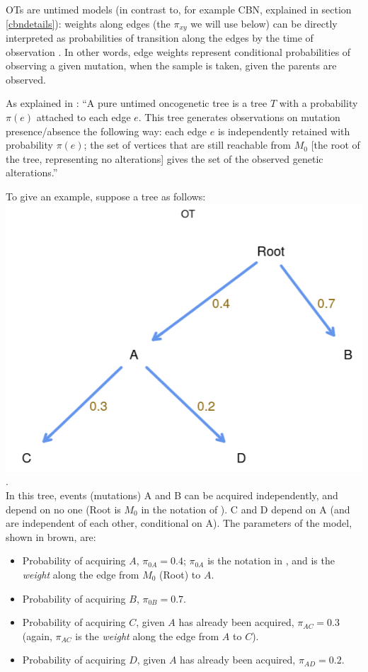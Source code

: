 \documentclass[a4paper,11pt]{article}
\begin{document}
OTs are untimed models (in contrast to, for example CBN, explained in section \ref{cbndetails}): weights along edges (the $\pi_{xy}$ we will use below) can be directly interpreted as probabilities of transition along the edges by the time of observation \citep[p.~5]{Szabo2008}. In other words, edge weights represent conditional probabilities of observing a given mutation, when the sample is taken, given the parents are observed.

As explained in \citep[Definition 1, p.~4]{Szabo2008}:  ``A pure untimed oncogenetic tree is a tree $T$ with a probability $\pi(e)$ attached to each edge $e$. This tree generates observations on mutation presence/absence the following way: each edge $e$ is independently retained with probability $\pi(e)$; the set of vertices that are still reachable from $M_0$ [the root of the tree, representing no alterations] gives the set of the observed genetic alterations.''


To give an example, suppose a tree as follows: \\

\includegraphics[width=.55\linewidth]{./dag_ot_ex1.png}.\\

In this tree, events (mutations) A and B can be acquired independently, and depend on no one (Root is $M_0$ in the notation of \citealp{Szabo2008}). C and D depend on A (and are independent of each other, conditional on A). The parameters of the model, shown in brown, are:
\begin{itemize}
\item Probability of acquiring $A$, $\pi_{0A} = 0.4$; $\pi_{0A}$ is the notation in \citealp{Szabo2008}, and is the \textit{weight} along the edge from $M_0$ (Root) to $A$.
\item Probability of acquiring $B$, $\pi_{0B} = 0.7$.
\item Probability of acquiring $C$, given $A$ has already been acquired, $\pi_{AC} = 0.3$ (again, $\pi_{AC}$ is the \textit{weight} along the edge from $A$ to $C$).
\item Probability of acquiring $D$, given $A$ has already been acquired, $\pi_{AD} = 0.2$. 
\end{itemize}
\end{document}
